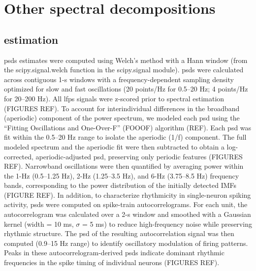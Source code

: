 \documentclass[12pt,a4paper]{report}
\newcommand{\g}[1]{\gls{#1}}     %
\newcommand{\gsp}[1]{\glsentryshortpl{#1}}  %
\newcommand{\gp}[1]{\glspl{#1}}  %
\newcommand{\Gp}[1]{\Glspl{#1}}  %
\begin{document}
\section{Other spectral decompositions}
\label{apdx:spectraldec}
\subsection{\gsp{psd} estimation}
 \gp{psd} estimates were computed using Welch’s method with a Hann window (from the scipy.signal.welch function in the scipy.signal module). \Gp{psd} were calculated across contiguous 1-s windows with a frequency-dependent sampling density optimized for slow and fast oscillations (20 points/Hz for 0.5–20 Hz; 4 points/Hz for 20–200 Hz). All \gp{lfp} signals were z-scored prior to spectral estimation (FIGURES REF). To account for interindividual differences in the broadband (aperiodic) component of the power spectrum, we modeled each \g{psd} using the “Fitting Oscillations and One-Over-F” (FOOOF) algorithm (REF). Each \g{psd} was fit within the 0.5–20 Hz range to isolate the aperiodic (1/f) component. The full modeled spectrum and the aperiodic fit were then subtracted to obtain a log-corrected, aperiodic-adjusted \g{psd}, preserving only periodic features (FIGURES REF). Narrowband oscillations were then quantified by averaging power within the 1-Hz (0.5–1.25 Hz), 2-Hz (1.25–3.5 Hz), and 6-Hz (3.75–8.5 Hz) frequency bands, corresponding to the power distribution of the initially detected IMFs (FIGURE REF). In addition, to characterize rhythmicity in single-neuron spiking activity, \gp{psd} were computed on spike-train autocorrelograms. For each unit, the autocorrelogram was calculated over a 2-s window and smoothed with a Gaussian kernel (width = 10 ms, $\sigma$  = 5 ms) to reduce high-frequency noise while preserving rhythmic structure. The \g{psd} of the resulting autocorrelation signal was then computed (0.9–15 Hz range) to identify oscillatory modulation of firing patterns. Peaks in these autocorrelogram-derived \gp{psd} indicate dominant rhythmic frequencies in the spike timing of individual neurons (FIGURES REF).
\end{document}
